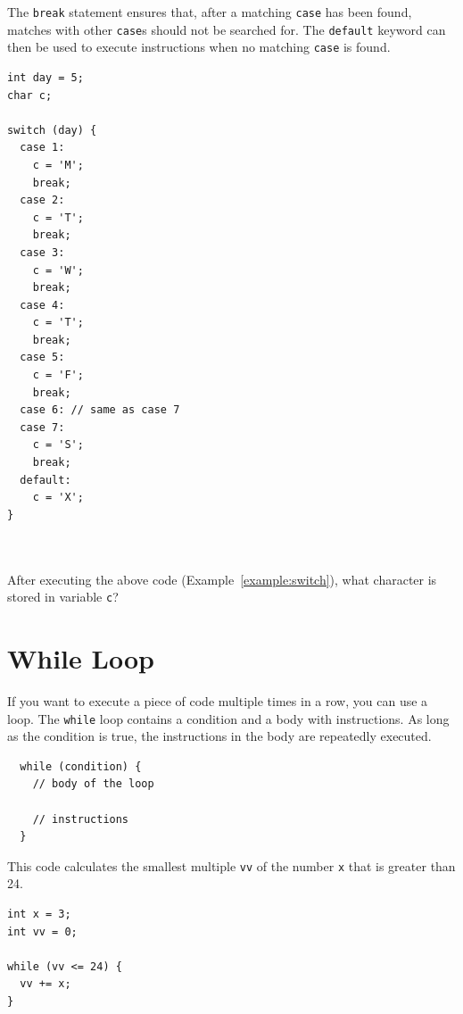 \documentclass[11pt,fleqn]{book} %
\begin{document}
The \texttt{break} statement ensures that, after a matching \texttt{case} has been found, matches with other \texttt{case}s should not be searched for. The \texttt{default} keyword can then be used to execute instructions when no matching \texttt{case} is found.

\begin{example}
	\label{example:switch}
	\phantom{ }
	\begin{verbatim}
int day = 5;
char c;

switch (day) {
  case 1:
    c = 'M';
    break;
  case 2:
    c = 'T';
    break;
  case 3:
    c = 'W';
    break;
  case 4:
    c = 'T';
    break;
  case 5:
    c = 'F';
    break;
  case 6: // same as case 7
  case 7:
    c = 'S';
    break;
  default:
    c = 'X';
}
	\end{verbatim}
\end{example}

\begin{exercise}
    \phantom{ }\\\\
    After executing the above code (Example~\ref{example:switch}), what character is stored in variable \texttt{c}?
\end{exercise}

\section{While Loop}
If you want to execute a piece of code multiple times in a row, you can use a loop. The \texttt{while} loop contains a condition and a body with instructions. As long as the condition is true, the instructions in the body are repeatedly executed.

\begin{definition}[While]
	\phantom{ }
	\begin{verbatim}
  while (condition) {
    // body of the loop

    // instructions
  }
	\end{verbatim}
	\vspace{0cm}
\end{definition}

\begin{example}[While]
    This code calculates the smallest multiple \texttt{vv} of the number \texttt{x} that is greater than 24.
	\begin{verbatim}
int x = 3;
int vv = 0;

while (vv <= 24) {
  vv += x;
}
	\end{verbatim}
\end{example}
\end{document}
